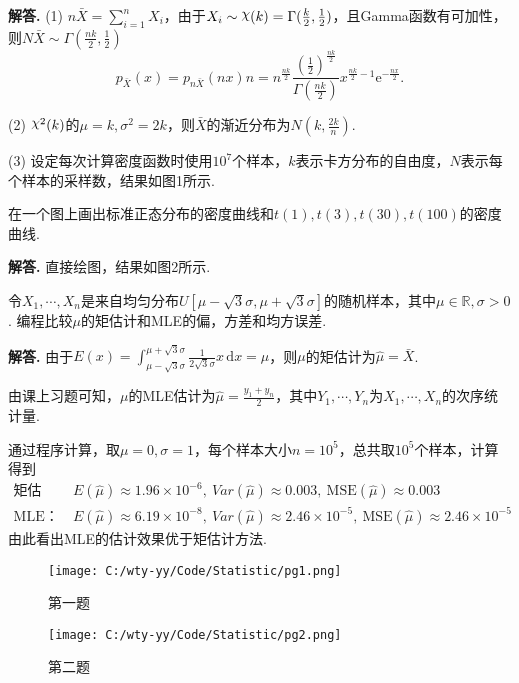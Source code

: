 \documentclass[12pt, a4paper, oneside]{ctexart}
\newcounter{problem}  %
\newcounter{problem*}  %
\newenvironment{problem*}{\stepcounter{problem*}\par\noindent\textbf{编程作业\arabic{problem*}. }}{\smallskip\par}
\newenvironment{solution}{\par\noindent\textbf{解答. }}{\smallskip\par}
\DeclareRobustCommand{\rchi}{{\mathpalette\irchi\relax}}  %
\newcommand{\irchi}[2]{\raisebox{\depth}{$#1\chi$}} %
\def\R{\mathbb{R}}          %
\def\d{\mathrm{d}}          %
\def\e{\mathrm{e}}          %
\def\del{\vspace{-3.5ex}}   %
\begin{document}
\begin{solution}
    (1) $n\bar{X} = \sum_{i=1}^nX_i$，由于$X_i\sim \rchi(k) = \Gamma(\frac{k}{2}, \frac{1}{2})$，且Gamma函数有可加性，则$N\bar{X}\sim\Gamma(\frac{nk}{2},\frac{1}{2})$\del
    \begin{equation*}
        p_{\bar{X}}(x) = p_{n\bar{X}}(n x)n = n^{\frac{nk}{2}}\frac{(\frac{1}{2})^{\frac{nk}{2}}}{\Gamma(\frac{nk}{2})}x^{\frac{nk}{2}-1}\e^{-\frac{nx}{2}}.
    \end{equation*}

    (2) $\rchi^2(k)$的$\mu = k, \sigma^2 = 2k$，则$\bar{X}$的渐近分布为$N(k, \frac{2k}{n})$.

    (3) 设定每次计算密度函数时使用$10^7$个样本，$k$表示卡方分布的自由度，$N$表示每个样本的采样数，结果如图1所示.
\end{solution}
\begin{problem*}
    在一个图上画出标准正态分布的密度曲线和$t(1), t(3), t(30), t(100)$的密度曲线.
\end{problem*}
\begin{solution}
    直接绘图，结果如图2所示.
\end{solution}
\begin{problem*}
    令$X_1,\cdots, X_n$是来自均匀分布$U[\mu-\sqrt{3}\sigma, \mu+\sqrt{3}\sigma]$的随机样本，其中$\mu\in\R, \sigma > 0$. 编程比较$\mu$的矩估计和MLE的偏，方差和均方误差.
\end{problem*}
\begin{solution}
    由于$E(x) = \int_{\mu-\sqrt{3}\sigma}^{\mu+\sqrt{3}\sigma}\frac{1}{2\sqrt{3}\sigma}x\,\d x=\mu$，则$\mu$的矩估计为$\hat{\mu} = \bar{X}$.

    由课上习题可知，$\mu$的MLE估计为$\hat{\mu}=\frac{y_1+y_n}{2}$，其中$Y_1,\cdots,Y_n$为$X_1,\cdots,X_n$的次序统计量.

    通过程序计算，取$\mu = 0,\sigma =1$，每个样本大小$n=10^5$，总共取$10^5$个样本，计算得到
    \begin{align*}
        \text{矩估计：}&\ E(\hat{\mu}) \approx 1.96\times 10^{-6},\ Var(\hat{\mu}) \approx 0.003,\ \text{MSE}(\hat{\mu}) \approx 0.003\\
        \text{MLE：}&\ E(\hat{\mu}) \approx 6.19\times 10^{-8},\ Var(\hat{\mu}) \approx 2.46\times 10^{-5},\ \text{MSE}(\hat{\mu}) \approx 2.46\times 10^{-5}
    \end{align*}
    由此看出MLE的估计效果优于矩估计方法.
\end{solution}
\begin{figure}[htbp]
    \centering
    \texttt{[image: C:/wty-yy/Code/Statistic/pg1.png]}
    \caption{第一题}
\end{figure}
\begin{figure}[htbp]
    \centering
    \texttt{[image: C:/wty-yy/Code/Statistic/pg2.png]}
    \caption{第二题}
\end{figure}
\end{document}
